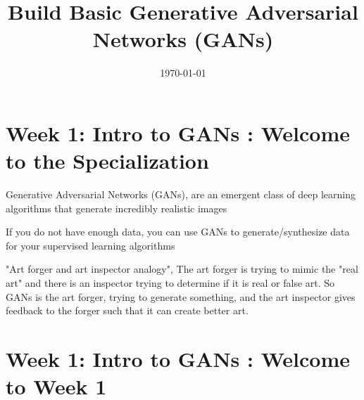 \documentclass[11pt, onecolumn]{article}
\title{Build Basic Generative Adversarial Networks (GANs)}	%
\date{\today}	%
\begin{document}

\maketitle		%

\thispagestyle{empty}	%




\newpage				%

\tableofcontents		%

\newpage				%


\section{Week 1: Intro to GANs : Welcome to the Specialization}

Generative Adversarial Networks (GANs), are an emergent class of deep learning algorithms that generate incredibly realistic images

If you do not have enough data, you can use GANs to generate/synthesize data for your supervised learning algorithms

"Art forger and art inspector analogy", The art forger is trying to mimic the "real art" and there is an inspector trying to determine if it is real or false art.  So GANs is the art forger, trying to generate something, and the art inspector gives feedback to the forger such that it can create better art.


\section{Week 1: Intro to GANs : Welcome to Week 1}
\end{document}
